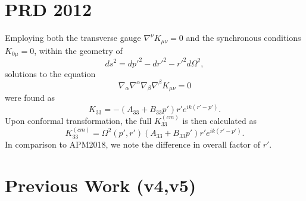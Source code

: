 \documentclass[10pt,letterpaper]{article}
\begin{document}
\section*{PRD 2012}
Employing both the transverse gauge $\nabla^\nu K_{\mu\nu}=0$ and the synchronous conditions $K_{0\mu}=0$, within the geometry of
\begin{equation}
ds^2= dp'^2 - dr'^2 - r'^2d\Omega^2,
\end{equation}
solutions to the equation
\begin{equation}
\nabla_\alpha \nabla^\alpha \nabla_\beta \nabla^\beta K_{\mu\nu} = 0
\end{equation}
were found as
\begin{equation}
K_{33} = -(A_{33}+B_{33}p')r' e^{ik(r'-p')}.
\end{equation}
Upon conformal transformation, the full $K_{33}^{(cm)}$ is then calculated as
\begin{equation}
K_{33}^{(cm)} = \Omega^2(p',r') (A_{33}+B_{33}p')r' e^{ik(r'-p')}.
\end{equation}
In comparison to APM2018, we note the difference in overall factor of $r'$. 


\newpage
\section*{Previous Work (v4,v5)}
\end{document}
